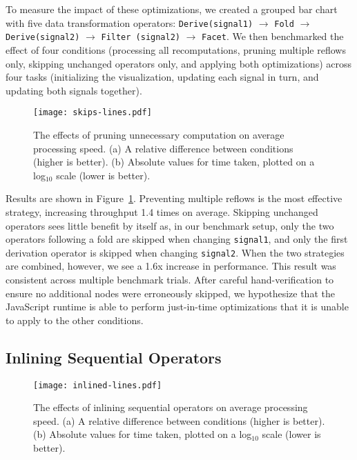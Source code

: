 To measure the impact of these optimizations, we created a grouped bar chart
with five data transformation operators: \texttt{Derive(signal1)} $\rightarrow$
\texttt{Fold} $\rightarrow$ \texttt{Derive(signal2)} $\rightarrow$
\texttt{Filter (signal2)} $\rightarrow$ \texttt{Facet}.  We then benchmarked the
effect of four conditions (processing all recomputations, pruning multiple
reflows only, skipping unchanged operators only, and applying both
optimizations) across four tasks (initializing the visualization, updating each
signal in turn, and updating both signals together).

\begin{figure}[b!]
  \centering
  \texttt{[image: skips-lines.pdf]}
  \caption{The effects of pruning unnecessary computation on average processing
speed. (a) A relative difference between conditions (higher is better). (b)
Absolute values for time taken, plotted on a log$_{10}$ scale (lower is better).}
  \label{fig:vg:skips_benchmark}
\end{figure}

Results are shown in Figure~\ref{fig:vg:skips_benchmark}. Preventing multiple
reflows is the most effective strategy, increasing throughput 1.4 times on
average. Skipping unchanged operators sees little benefit by itself as, in our
benchmark setup, only the two operators following a fold are skipped when
changing \texttt{signal1}, and only the first derivation operator is skipped
when changing \texttt{signal2}. When the two strategies are combined, however,
we see a 1.6x increase in performance. This result was consistent across
multiple benchmark trials. After careful hand-verification to ensure no
additional nodes were erroneously skipped, we hypothesize that the JavaScript
runtime is able to perform just-in-time optimizations that it is unable to apply
to the other conditions.

\vspace{-10pt}

\subsection{Inlining Sequential Operators}

\vspace{-7pt}

\begin{figure}[b!]
  \centering
  \texttt{[image: inlined-lines.pdf]}
  \caption{The effects of inlining sequential operators on average processing
speed. (a) A relative difference between conditions (higher is better). (b)
Absolute values for time taken, plotted on a log$_{10}$ scale (lower is better).}
  \label{fig:vg:inline_benchmark}
\end{figure}

